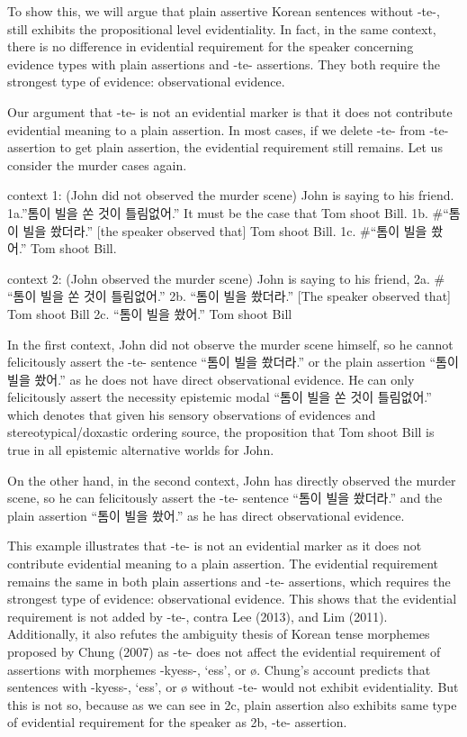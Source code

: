 To show this, we will argue that plain assertive Korean sentences
without -te-, still exhibits the propositional level evidentiality. In
fact, in the same context, there is no difference in evidential
requirement for the speaker concerning evidence types with plain
assertions and -te- assertions. They both require the strongest type of
evidence: observational evidence.

Our argument that -te- is not an evidential marker is that it does not
contribute evidential meaning to a plain assertion. In most cases, if we
delete -te- from -te- assertion to get plain assertion, the evidential
requirement still remains. Let us consider the murder cases again.

context 1: (John did not observed the murder scene) John is saying to
his friend. 1a.''톰이 빌을 쏜 것이 틀림없어.'' It must be the case that
Tom shoot Bill. 1b. \#``톰이 빌을 쐈더라.'' {[}the speaker observed
that{]} Tom shoot Bill. 1c. \#``톰이 빌을 쐈어.'' Tom shoot Bill.

context 2: (John observed the murder scene) John is saying to his
friend, 2a. \# ``톰이 빌을 쏜 것이 틀림없어.'' 2b. ``톰이 빌을 쐈더라.''
{[}The speaker observed that{]} Tom shoot Bill 2c. ``톰이 빌을 쐈어.''
Tom shoot Bill

In the first context, John did not observe the murder scene himself, so
he cannot felicitously assert the -te- sentence ``톰이 빌을 쐈더라.'' or
the plain assertion ``톰이 빌을 쐈어.'' as he does not have direct
observational evidence. He can only felicitously assert the necessity
epistemic modal ``톰이 빌을 쏜 것이 틀림없어.'' which denotes that given
his sensory observations of evidences and stereotypical/doxastic
ordering source, the proposition that Tom shoot Bill is true in all
epistemic alternative worlds for John.

On the other hand, in the second context, John has directly observed the
murder scene, so he can felicitously assert the -te- sentence ``톰이
빌을 쐈더라.'' and the plain assertion ``톰이 빌을 쐈어.'' as he has
direct observational evidence.

This example illustrates that -te- is not an evidential marker as it
does not contribute evidential meaning to a plain assertion. The
evidential requirement remains the same in both plain assertions and
-te- assertions, which requires the strongest type of evidence:
observational evidence. This shows that the evidential requirement is
not added by -te-, contra Lee (2013), and Lim (2011). Additionally, it
also refutes the ambiguity thesis of Korean tense morphemes proposed by
Chung (2007) as -te- does not affect the evidential requirement of
assertions with morphemes -kyess-, `ess', or ø. Chung's account predicts
that sentences with -kyess-, `ess', or ø without -te- would not exhibit
evidentiality. But this is not so, because as we can see in 2c, plain
assertion also exhibits same type of evidential requirement for the
speaker as 2b, -te- assertion.

